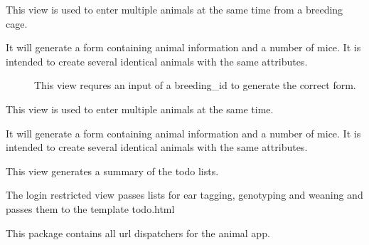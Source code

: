\documentclass[letterpaper,10pt,english]{sphinxmanual}
\begin{document}

\begin{fulllineitems}
\label{api:mousedb.animal.views.multiple_breeding_pups}
This view is used to enter multiple animals at the same time from a breeding cage.
\begin{description}
\item[{It will generate a form containing animal information and a number of mice.  It is intended to create several identical animals with the same attributes.}] \leavevmode
This view requres an input of a breeding\_id to generate the correct form.

\end{description}

\end{fulllineitems}



\begin{fulllineitems}
\label{api:mousedb.animal.views.multiple_pups}
This view is used to enter multiple animals at the same time.

It will generate a form containing animal information and a number of mice.  It is intended to create several identical animals with the same attributes.

\end{fulllineitems}



\begin{fulllineitems}
\label{api:mousedb.animal.views.todo}
This view generates a summary of the todo lists.

The login restricted view passes lists for ear tagging, genotyping and weaning and passes them to the template todo.html

\end{fulllineitems}

\label{api:module-mousedb.animal.urls}
This package contains all url dispatchers for the animal app.
\end{document}
